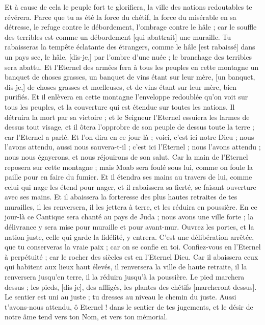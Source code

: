 \begin{multicols}{2}
Et à cause de cela le peuple fort te glorifiera, la ville des nations redoutables te révérera.
Parce que tu as été la force du chétif, la force du misérable en sa détresse, le refuge contre le débordement, l'ombrage contre le hâle ; car le souffle des terribles est comme un débordement [qui abattrait] une muraille.
Tu rabaisseras la tempête éclatante des étrangers, comme le hâle [est rabaissé] dans un pays sec, le hâle, [dis-je,] par l'ombre d'une nuée ; le branchage des terribles sera abattu.
Et l'Eternel des armées fera à tous les peuples en cette montagne un banquet de choses grasses, un banquet de vins étant sur leur mère, [un banquet, dis-je,] de choses grasses et mœlleuses, et de vins étant sur leur mère, bien purifiés.
Et il enlèvera en cette montagne l'enveloppe redoublée qu'on voit sur tous les peuples, et la couverture qui est étendue sur toutes les nations.
Il détruira la mort par sa victoire ; et le Seigneur l'Eternel essuiera les larmes de dessus tout visage, et il ôtera l'opprobre de son peuple de dessus toute la terre ; car l'Eternel a parlé.
Et l'on dira en ce jour-là ; voici, c'est ici notre Dieu ; nous l'avons attendu, aussi nous sauvera-t-il ; c'est ici l'Eternel ; nous l'avons attendu ; nous nous égayerons, et nous réjouirons de son salut.
Car la main de l'Eternel reposera sur cette montagne ; mais Moab sera foulé sous lui, comme on foule la paille pour en faire du fumier.
Et il étendra ses mains au travers de lui, comme celui qui nage les étend pour nager, et il rabaissera sa fierté, se faisant ouverture avec ses mains.
Et il abaissera la forteresse des plus hautes retraites de tes murailles, il les renversera, il les jettera à terre, et les réduira en poussière.
\VerseOne{}En ce jour-là ce Cantique sera chanté au pays de Juda ; nous avons une ville forte ; la délivrance y sera mise pour muraille et pour avant-mur.
Ouvrez les portes, et la nation juste, celle qui garde la fidélité, y entrera.
C'est une délibération arrêtée, que tu conserveras la vraie paix ; car on se confie en toi.
Confiez-vous en l'Eternel à perpétuité ; car le rocher des siècles est en l'Eternel Dieu.
Car il abaissera ceux qui habitent aux lieux haut élevés, il renversera la ville de haute retraite, il la renversera jusqu'en terre, il la réduira jusqu'à la poussière.
Le pied marchera dessus ; les pieds, [dis-je], des affligés, les plantes des chétifs [marcheront dessus].
Le sentier est uni au juste ; tu dresses au niveau le chemin du juste.
Aussi t'avons-nous attendu, ô Eternel ! dans le sentier de tes jugements, et le désir de notre âme tend vers ton Nom, et vers ton mémorial.

\end{multicols}
